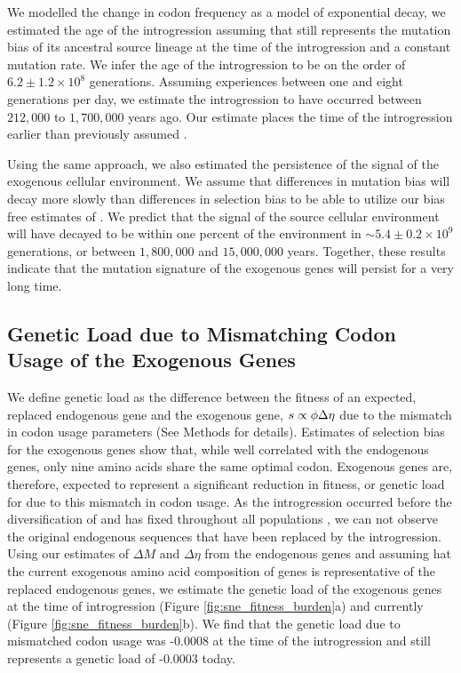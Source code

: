 \documentclass[fleqn,letterpaper]{article}
\begin{document}
We modelled the change in codon frequency as a model of exponential decay, we estimated the age of the introgression assuming that \gossypii still represents the mutation bias of its ancestral source lineage at the time of the introgression and a constant mutation rate.
We infer the age of the introgression to be on the order of $6.2\pm1.2\times 10^8$ generations. 
Assuming \kluyveri experiences between one and eight generations per day, we estimate the introgression to have occurred between $212,000$ to $1,700,000$ years ago.
Our estimate places the time of the introgression earlier than previously assumed \citep{friedrich2015}.

Using the same approach, we also estimated the persistence of the signal of the exogenous cellular environment.
We assume that differences in mutation bias will decay more slowly than differences in selection bias to be able to utilize our bias free estimates of \DM.
We predict that the \DM signal of the source cellular environment will have decayed to be within one percent of the \kluyveri environment in $\sim 5.4\pm0.2\times 10^9 $ generations, or between $1,800,000$ and $15,000,000$ years.
Together, these results indicate that the mutation signature of the exogenous genes will persist for a very long time.

\subsection*{Genetic Load due to Mismatching Codon Usage of the Exogenous Genes}

We define genetic load as the difference between the fitness of an expected, replaced endogenous gene and the exogenous gene, $s \propto \phi {\Delta \eta}$ due to the mismatch in codon usage parameters (See Methods for details).
Estimates of selection bias for the exogenous genes show that, while well correlated with the endogenous genes, only nine amino acids share the same optimal codon.
Exogenous genes are, therefore, expected to represent a significant reduction in fitness, or genetic load for \kluyveri due to this mismatch in codon usage.
As the introgression occurred before the diversification of \kluyveri and has fixed throughout all populations \citep{friedrich2015}, we can not observe the original endogenous sequences that have been replaced by the introgression.
Using our estimates of $\Delta M$ and $\Delta \eta$ from the endogenous genes and assuming hat the current exogenous amino acid composition of genes is representative of the replaced endogenous genes, we estimate the genetic load of the exogenous genes at the time of introgression (Figure \ref{fig:sne_fitness_burden}a) and currently (Figure \ref{fig:sne_fitness_burden}b).
We find that the genetic load due to mismatched codon usage was -0.0008 at the time of the introgression and still represents a genetic load of -0.0003 today.
\end{document}
